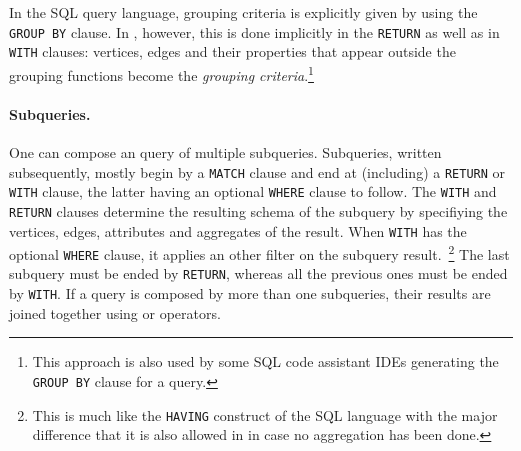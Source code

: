 In the SQL query language, grouping criteria is explicitly given by using the \lstinline+GROUP BY+ clause. In \opencypher, however, this is done implicitly in the \lstinline+RETURN+ as well as in \lstinline+WITH+ clauses: vertices, edges and their properties that appear outside the grouping functions become the \emph{grouping criteria}.\footnote{This approach is also used by some SQL code assistant IDEs generating the \lstinline+GROUP BY+ clause for a query.}

\paragraph{Subqueries.} One can compose an \opencypher query of multiple subqueries. Subqueries, written subsequently, mostly begin by a \lstinline+MATCH+ clause and end at (including) a \lstinline+RETURN+ or \lstinline+WITH+ clause, the latter having an optional \lstinline+WHERE+ clause to follow. The \lstinline+WITH+ and \lstinline+RETURN+ clauses determine the resulting schema of the subquery by specifiying the vertices, edges, attributes and aggregates of the result. When \lstinline+WITH+ has the optional \lstinline+WHERE+ clause, it applies an other filter on the subquery result.~\footnote{This is much like the \lstinline+HAVING+ construct of the SQL language with the major difference that it is also allowed in \opencypher in case no aggregation has been done.} The last subquery must be ended by \lstinline+RETURN+, whereas all the previous ones must be ended by \lstinline+WITH+. If a query is composed by more than one subqueries, their results are joined together using \jointext or \leftouterjointext operators.
